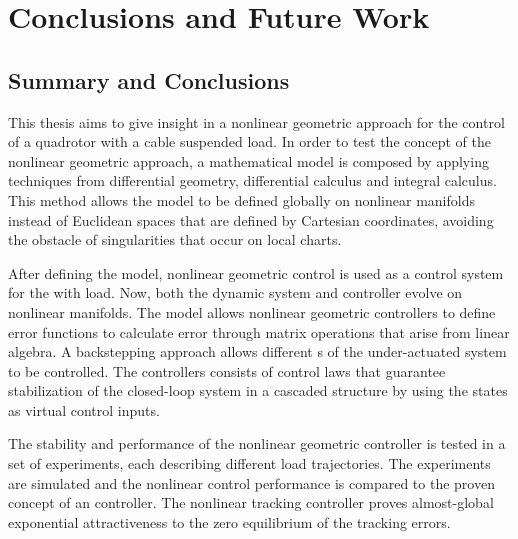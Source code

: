 \chapter{Conclusions and Future Work}\label{ch:conclusion}
\section{Summary and Conclusions}
This thesis aims to give insight in a nonlinear geometric approach for the control of a quadrotor with a cable suspended load. 
In order to test the concept of the nonlinear geometric approach, a mathematical model is composed by applying techniques from differential geometry, differential calculus and integral calculus. 
This method allows the model to be defined globally on nonlinear manifolds instead of Euclidean spaces that are defined by Cartesian coordinates, avoiding the obstacle of singularities that occur on local charts.

After defining the model, nonlinear geometric control is used as a control system for the  with load.
Now, both the dynamic system and controller evolve on nonlinear manifolds.
The model allows nonlinear geometric controllers to define error functions to calculate error through matrix operations that arise from linear algebra. 
A backstepping approach allows different s of the under-actuated system to be controlled.
The controllers consists of control laws that guarantee stabilization of the closed-loop system in a cascaded structure by using the states as virtual control inputs. 

The stability and performance of the nonlinear geometric controller is tested in a set of experiments, each describing different load trajectories. 
The experiments are simulated and the nonlinear control performance is compared to the proven concept of an  controller.
The nonlinear tracking controller proves almost-global exponential attractiveness to the zero equilibrium of the tracking errors. 



